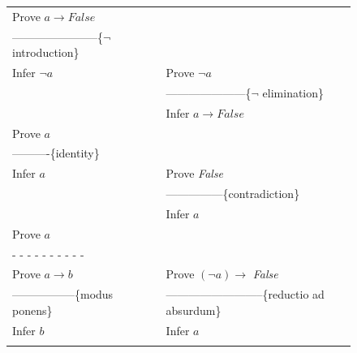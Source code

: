 \begin{figure}
\begin{center}
\begin{tabular}{ll}
Prove $a \rightarrow False$                             &                                                   \\
-----------------------\{$\neg$ introduction\}          &                                                   \\
Infer $\neg a$                                          & Prove $\neg a$                                    \\
                                                        & ---------------------\{$\neg$ elimination\}       \\
                                                        & Infer $a \rightarrow False$                       \\
Prove $a$                                               &                                                   \\
----------\{identity\}                                  &                                                   \\
Infer $a$                                               & Prove \emph{False}                                \\
                                                        & ---------------\{contradiction\}                  \\
                                                        & Infer $a$                                         \\
Prove $a$                                               &                                                   \\
 - - - - - - - - - -                                    &                                                   \\
Prove $a \rightarrow b$                                 & Prove $(\neg a) \rightarrow$ \emph{False}         \\
-----------------\{modus ponens\}                       & --------------------------\{reductio ad absurdum\}\\
Infer $b$                                               & Infer $a$                                         \\
                                                        &                                                   \\
\end{tabular}
\end{center}
\begin{center}
\begin{tabular}{ll}

\end{tabular}
\end{center}
\end{figure}
